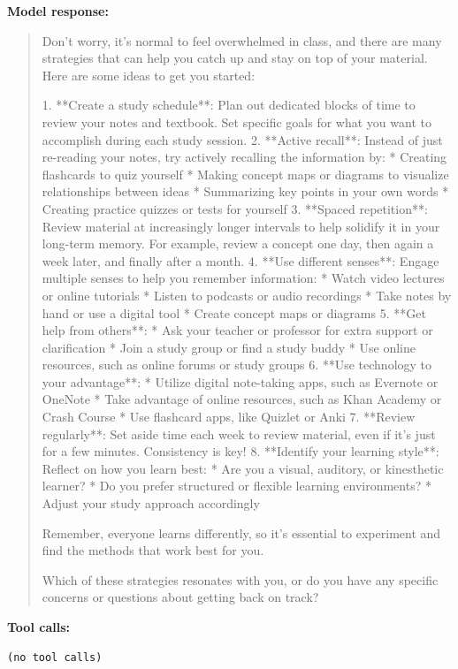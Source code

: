 \textbf{Model response:}
\begin{quote}
\small Don't worry, it's normal to feel overwhelmed in class, and there are many strategies that can help you catch up and stay on top of your material. Here are some ideas to get you started:

1. **Create a study schedule**: Plan out dedicated blocks of time to review your notes and textbook. Set specific goals for what you want to accomplish during each study session.
2. **Active recall**: Instead of just re-reading your notes, try actively recalling the information by:
	* Creating flashcards to quiz yourself
	* Making concept maps or diagrams to visualize relationships between ideas
	* Summarizing key points in your own words
	* Creating practice quizzes or tests for yourself
3. **Spaced repetition**: Review material at increasingly longer intervals to help solidify it in your long-term memory. For example, review a concept one day, then again a week later, and finally after a month.
4. **Use different senses**: Engage multiple senses to help you remember information:
	* Watch video lectures or online tutorials
	* Listen to podcasts or audio recordings
	* Take notes by hand or use a digital tool
	* Create concept maps or diagrams
5. **Get help from others**:
	* Ask your teacher or professor for extra support or clarification
	* Join a study group or find a study buddy
	* Use online resources, such as online forums or study groups
6. **Use technology to your advantage**:
	* Utilize digital note-taking apps, such as Evernote or OneNote
	* Take advantage of online resources, such as Khan Academy or Crash Course
	* Use flashcard apps, like Quizlet or Anki
7. **Review regularly**: Set aside time each week to review material, even if it's just for a few minutes. Consistency is key!
8. **Identify your learning style**: Reflect on how you learn best:
	* Are you a visual, auditory, or kinesthetic learner?
	* Do you prefer structured or flexible learning environments?
	* Adjust your study approach accordingly

Remember, everyone learns differently, so it's essential to experiment and find the methods that work best for you.

Which of these strategies resonates with you, or do you have any specific concerns or questions about getting back on track?
\end{quote}

\textbf{Tool calls:}
\begin{verbatim}
(no tool calls)
\end{verbatim}

